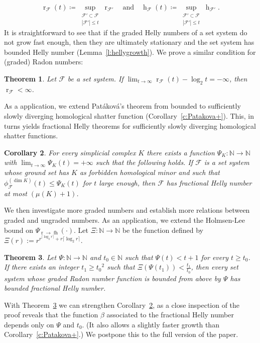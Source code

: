 \documentclass[11pt]{article}
\newcommand{\N}{\mathbb{N}}
\newcommand{\F}{\mathcal{F}}
\DeclareMathOperator{\h}{h}
\DeclareMathOperator{\rad}{r}
\DeclareMathOperator{\fh}{fh}
\newcommand{\pth}[1]{\left(#1\right)}
\newtheorem{theorem}{Theorem}
\newtheorem{corollary}[theorem]{Corollary}
\begin{document}
%
\begin{equation}
  \rad_\F(t) \coloneqq \sup \limits_{\substack{\F'\subset \F \\ |\F'|\leq t}} \rad_{\F'}
 \quad \text{and} \quad
 \h_\F(t) \coloneqq \sup\limits_{\substack{\F'\subset \F \\ |\F'|\leq t}} \h_{\F'}.
\end{equation}
%
\noindent
It is straightforward to see that if the graded Helly numbers of a set system do not grow fast enough, then they are ultimately stationary and the set system has bounded Helly number (Lemma~\ref{l:hellygrowth}). We prove a similar condition for (graded) Radon numbers:
%

\begin{theorem}\label{t:radgrowth}
  Let $\F$ be a set system. If $\lim_{t \to \infty} \rad_\F(t) - \log_2 t = -\infty$, then $\rad_\F < \infty$.
\end{theorem}

%
\noindent
As a application, we extend Patáková's theorem from bounded to sufficiently slowly diverging homological shatter function (Corollary~\ref{c:Patakova+}). This, in turns yields fractional Helly theorems for sufficiently slowly diverging homological shatter functions.
%
\begin{corollary}\label{c:itgrows!}
  For every simplicial complex $K$ there exists a function $\Psi_K : \N \to \N$ with $\lim_{t \to \infty} \Psi_K(t) = +\infty$ such that the following holds. If $\F$ is a set system whose ground set has $K$ as forbidden homological minor and such that $\phi_{\F}^{(\dim K)}(t) \le \Psi_K(t)$ for $t$ large enough, then $\F$ has fractional Helly number at most $(\mu(K)+1)$.
\end{corollary}
%
\medskip
%
We then investigate more graded numbers and establish more relations between graded and ungraded numbers. As an application, we extend the Holmsen-Lee bound on $\Psi_{\rad \to \fh}(\cdot)$. Let $\Xi: \N \to \N$ be the function defined by $\Xi(r) := r^{r^{\lceil \log_2r \rceil}+r\lceil \log_2r \rceil}$. 
%
\begin{theorem}\label{t:radgrowth2}
  Let $\Psi: \N\rightarrow \N$ and $t_0 \in \N$ such that $\Psi(t) < t+1$ for every $t \ge t_0$. If there exists an integer $t_1 \ge {t_0}^2$ such that $\Xi\pth{\Psi(t_1)} < \frac{t_1}{t_0}$, then every set system whose graded Radon number function is bounded from above by $\Psi$ has bounded fractional Helly number.
\end{theorem}
%
\noindent
With Theorem~\ref{t:radgrowth2} we can strengthen Corollary~\ref{c:itgrows!}, as a close inspection of the proof reveals that the function $\beta$ associated to the fractional Helly number depends only on $\Psi$ and $t_0$. (It also allows a slightly faster growth than Corollary~\ref{c:Patakova+}.) We postpone this to the full version of the paper.
%
%
\end{document}
